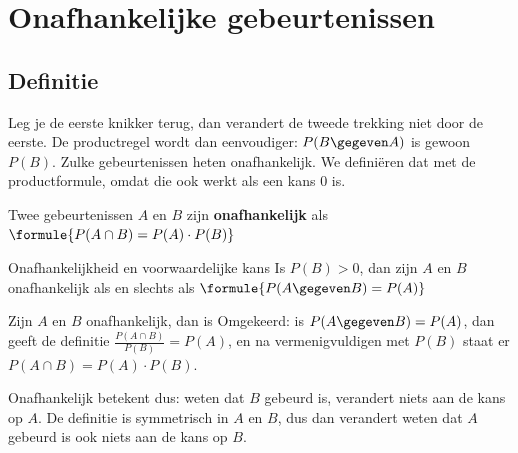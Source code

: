 \section{Onafhankelijke gebeurtenissen}

\subsection{Definitie}

Leg je de eerste knikker terug, dan verandert de tweede trekking niet door de eerste. De productregel wordt dan eenvoudiger: $P(B \gegeven A)$ is gewoon $P(B)$. Zulke gebeurtenissen heten onafhankelijk. We definiëren dat met de productformule, omdat die ook werkt als een kans 0 is.

\begin{theorie}
Twee gebeurtenissen $A$ en $B$ zijn \textbf{\textcolor{accent}{onafhankelijk}} als \quad $\formule{P(A \cap B) = P(A) \cdot P(B)}$

\begin{stelling}{Onafhankelijkheid en voorwaardelijke kans}
Is $P(B) > 0$, dan zijn $A$ en $B$ onafhankelijk als en slechts als \quad $\formule{P(A \gegeven B) = P(A)}$
\end{stelling}

\begin{bewijs}
Zijn $A$ en $B$ onafhankelijk, dan is
Omgekeerd: is $P(A \gegeven B) = P(A)$, dan geeft de definitie $\frac{P(A \cap B)}{P(B)} = P(A)$, en na vermenigvuldigen met $P(B)$ staat er $P(A \cap B) = P(A) \cdot P(B)$.
\end{bewijs}
\end{theorie}

Onafhankelijk betekent dus: weten dat $B$ gebeurd is, verandert niets aan de kans op $A$. De definitie is symmetrisch in $A$ en $B$, dus dan verandert weten dat $A$ gebeurd is ook niets aan de kans op $B$.


